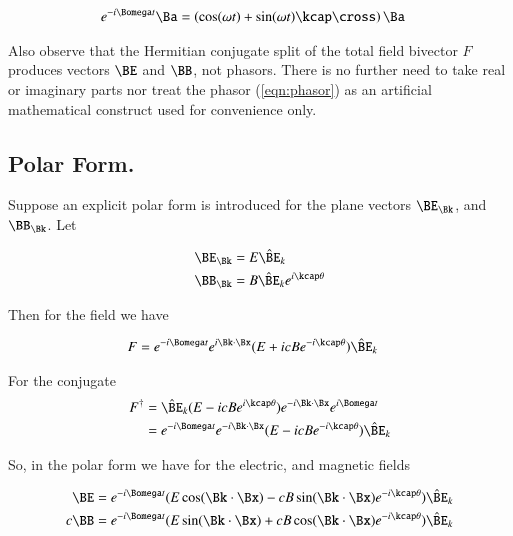 \begin{align*}
e^{-i\Bomega t} \Ba
&=
\left( \cos(\omega t) + \sin(\omega t) \kcap \cross \right) \Ba
\end{align*}

Also observe that the Hermitian conjugate split of the total field bivector $F$ produces vectors $\BE$ and $\BB$, not phasors.  There is no further need to take real or imaginary parts nor treat the phasor (\ref{eqn:phasor}) as an artificial mathematical construct used for convenience only.

\subsection{Polar Form.}

Suppose an explicit polar form is introduced for the plane vectors $\BE_\Bk$, and $\BB_\Bk$.  Let

\begin{align*}
\BE_\Bk &= E {\hat{\BE}_k} \\
\BB_\Bk &= B {\hat{\BE}_k} e^{i\kcap \theta}
\end{align*}

Then for the field we have

\begin{align}\label{eqn:phasorPolar}
F &= e^{-i\Bomega t} e^{i \Bk \cdot \Bx} (E + i c B e^{-i\kcap \theta}) \hat{\BE}_k
\end{align}

For the conjugate
\begin{align*}
F^\dagger
&=
\hat{\BE}_k
(E - i c B e^{i\kcap \theta})
e^{-i \Bk \cdot \Bx}
e^{i\Bomega t} \\
&=
e^{-i\Bomega t} e^{-i \Bk \cdot \Bx} (E - i c B e^{-i\kcap \theta}) \hat{\BE}_k
\end{align*}

So, in the polar form we have for the electric, and magnetic fields

\begin{align}\label{eqn:fieldsPolar}
\BE &= e^{-i\Bomega t} (E \cos(\Bk \cdot \Bx) - c B \sin(\Bk \cdot \Bx) e^{-i \kcap\theta}) \hat{\BE}_k \\
c \BB &= e^{-i\Bomega t} (E \sin(\Bk \cdot \Bx) + c B \cos(\Bk \cdot \Bx) e^{-i \kcap\theta}) \hat{\BE}_k
\end{align}

